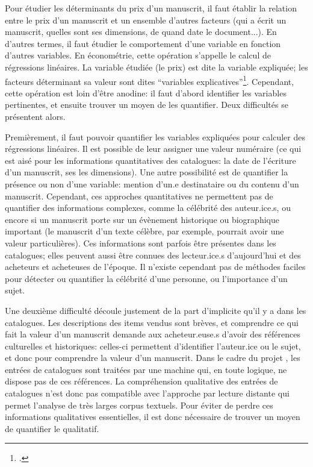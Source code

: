 Pour étudier les déterminants du prix d'un manuscrit, il faut établir la relation entre le prix d'un manuscrit et un ensemble d'autres facteurs (qui a écrit un manuscrit, quelles sont ses dimensions, de quand date le document...). En d'autres termes, il faut étudier le comportement d'une variable en fonction d'autres variables. En économétrie, cette opération s'appelle le calcul de régressions linéaires. La variable étudiée (le prix) est dite la variable expliquée; les facteurs déterminant sa valeur sont dites \enquote{variables explicatives}\footcite{noauthor_regression_2022}. Cependant, cette opération est loin d'être anodine: il faut d'abord identifier les variables pertinentes, et ensuite trouver un moyen de les quantifier. Deux difficultés se présentent alors.

Premièrement, il faut pouvoir quantifier les variables expliquées pour calculer des régressions linéaires. Il est possible de leur assigner une valeur numéraire (ce qui est aisé pour les informations quantitatives des catalogues: la date de l'écriture d'un manuscrit, ses les dimensions). Une autre possibilité est de quantifier la présence ou non d'une variable: mention d'un.e destinataire ou du contenu d'un manuscrit. Cependant, ces approches quantitatives ne permettent pas de quantifier des informations complexes, comme la célébrité des auteur.ice.s, ou encore si un manuscrit porte sur un évènement historique ou biographique important (le manuscrit d'un texte célèbre, par exemple, pourrait avoir une valeur particulières). Ces informations sont parfois être présentes dans les catalogues; elles peuvent aussi être connues des lecteur.ice.s d'aujourd'hui et des acheteurs et acheteuses de l'époque. Il n'existe cependant pas de méthodes faciles pour détecter ou quantifier la célébrité d'une personne, ou l'importance d'un sujet.

Une deuxième difficulté découle justement de la part d'implicite qu'il y a dans les catalogues. Les descriptions des items vendus sont brèves, et comprendre ce qui fait la valeur d'un manuscrit demande aux acheteur.euse.s d'avoir des références culturelles et historiques: celles-ci permettent d'identifier l'auteur.ice ou le sujet, et donc pour comprendre la valeur d'un manuscrit. Dans le cadre du projet \mssktb{}, les entrées de catalogues sont traitées par une machine qui, en toute logique, ne dispose pas de ces références. La compréhension qualitative des entrées de catalogues n'est donc pas compatible avec l'approche par lecture distante qui permet l'analyse de très larges corpus textuels. Pour éviter de perdre ces informations qualitatives essentielles, il est donc nécessaire de trouver un moyen de quantifier le qualitatif.

